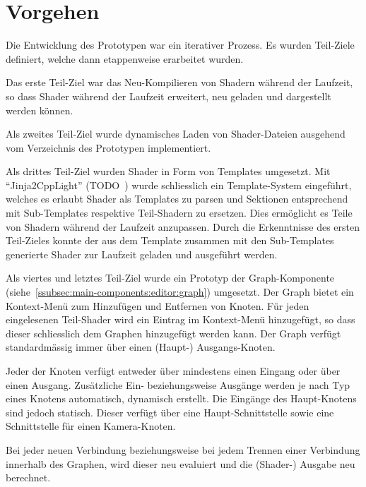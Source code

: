 
\section{Vorgehen}
\label{sec:prototype:procedure}

Die Entwicklung des Prototypen war ein iterativer Prozess. Es wurden Teil-Ziele
definiert, welche dann etappenweise erarbeitet wurden.

Das erste Teil-Ziel war das Neu-Kompilieren von Shadern während der Laufzeit,
so dass Shader während der Laufzeit erweitert, neu geladen und dargestellt
werden können.

Als zweites Teil-Ziel wurde dynamisches Laden von Shader-Dateien ausgehend vom
Verzeichnis des Prototypen implementiert.

Als drittes Teil-Ziel wurden Shader in Form von Templates umgesetzt.  Mit
``Jinja2CppLight'' (TODO~) wurde
schliesslich ein Template-System eingeführt, welches es erlaubt Shader als
Templates zu parsen und Sektionen entsprechend mit Sub-Templates respektive
Teil-Shadern zu ersetzen.  Dies ermöglicht es Teile von Shadern während der
Laufzeit anzupassen. Durch die Erkenntnisse des ersten Teil-Zieles konnte der
aus dem Template zusammen mit den Sub-Templates generierte Shader zur Laufzeit
geladen und ausgeführt werden.

Als viertes und letztes Teil-Ziel wurde ein Prototyp der Graph-Komponente
(siehe~\ref{ssubsec:main-components:editor:graph}) umgesetzt. Der Graph bietet
ein Kontext-Menü zum Hinzufügen und Entfernen von Knoten. Für jeden
eingelesenen Teil-Shader wird ein Eintrag im Kontext-Menü hinzugefügt, so dass
dieser schliesslich dem Graphen hinzugefügt werden kann. Der Graph verfügt
standardmässig immer über einen (Haupt-) Ausgangs-Knoten.

Jeder der Knoten verfügt entweder über mindestens einen Eingang oder über einen
Ausgang.  Zusätzliche Ein- beziehungsweise Ausgänge werden je nach Typ eines
Knotens automatisch, dynamisch erstellt. Die Eingänge des Haupt-Knotens sind
jedoch statisch. Dieser verfügt über eine Haupt-Schnittstelle sowie eine
Schnittstelle für einen Kamera-Knoten.

Bei jeder neuen Verbindung beziehungsweise bei jedem Trennen einer Verbindung
innerhalb des Graphen, wird dieser neu evaluiert und die (Shader-) Ausgabe neu
berechnet.

